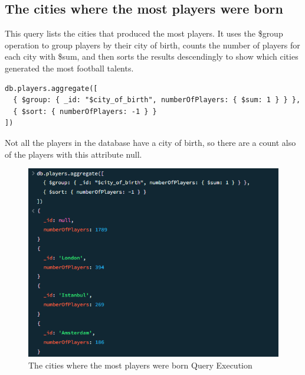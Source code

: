 \documentclass{Configuration_Files/PoliMi3i_thesis}
\begin{document}
\subsection{The cities where the most players were born}
This query lists the cities that produced the most players. It uses the \$group operation to group players by their city of birth, counts the number of players for each city with \$sum, and then sorts the results descendingly to show which cities generated the most football talents.
\begin{verbatim}
db.players.aggregate([
  { $group: { _id: "$city_of_birth", numberOfPlayers: { $sum: 1 } } },
  { $sort: { numberOfPlayers: -1 } }
])
\end{verbatim}
Not all the players in the database have a city of birth, so there are a count also of the players with this attribute null.
\begin{figure}[htbp]
    \centering
    \includegraphics[scale=1]{Images/Queries/Cities/cities.png}
    \caption{The cities where the most players were born Query Execution}
\end{figure}
\end{document}
